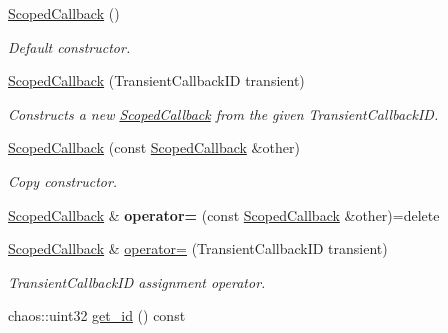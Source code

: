 \begin{DoxyCompactItemize}
\item 
\hyperlink{classsigma_1_1core_1_1_scoped_callback_ab7d6ecc53f4f2ae5c099aa432ca5fe46}{Scoped\+Callback} ()
\begin{DoxyCompactList}\small\item\em Default constructor. \end{DoxyCompactList}\item 
\hyperlink{classsigma_1_1core_1_1_scoped_callback_aa6b342b546577026badad33e7bf521b9}{Scoped\+Callback} (Transient\+Callback\+I\+D transient)
\begin{DoxyCompactList}\small\item\em Constructs a new \hyperlink{classsigma_1_1core_1_1_scoped_callback}{Scoped\+Callback} from the given Transient\+Callback\+I\+D. \end{DoxyCompactList}\item 
\hyperlink{classsigma_1_1core_1_1_scoped_callback_ae39d91862f76b1804acc8edae410678e}{Scoped\+Callback} (const \hyperlink{classsigma_1_1core_1_1_scoped_callback}{Scoped\+Callback} \&other)
\begin{DoxyCompactList}\small\item\em Copy constructor. \end{DoxyCompactList}\item 
\hypertarget{classsigma_1_1core_1_1_scoped_callback_ab0eabc2e0c158643758501f9c6bc444c}{}\hyperlink{classsigma_1_1core_1_1_scoped_callback}{Scoped\+Callback} \& {\bfseries operator=} (const \hyperlink{classsigma_1_1core_1_1_scoped_callback}{Scoped\+Callback} \&other)=delete\label{classsigma_1_1core_1_1_scoped_callback_ab0eabc2e0c158643758501f9c6bc444c}

\item 
\hyperlink{classsigma_1_1core_1_1_scoped_callback}{Scoped\+Callback} \& \hyperlink{classsigma_1_1core_1_1_scoped_callback_a482feda3a077f8c4877a4a56df7eefa3}{operator=} (Transient\+Callback\+I\+D transient)
\begin{DoxyCompactList}\small\item\em Transient\+Callback\+I\+D assignment operator. \end{DoxyCompactList}\item 
\hypertarget{classsigma_1_1core_1_1_scoped_callback_a3b4ae371184bb639999677cf66440461}{}chaos\+::uint32 \hyperlink{classsigma_1_1core_1_1_scoped_callback_a3b4ae371184bb639999677cf66440461}{get\+\_\+id} () const \label{classsigma_1_1core_1_1_scoped_callback_a3b4ae371184bb639999677cf66440461}


\end{DoxyCompactItemize}

